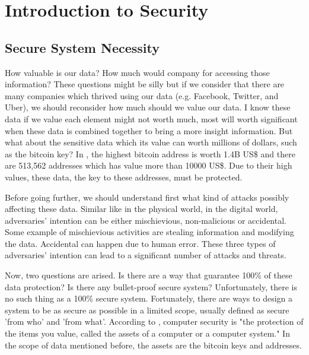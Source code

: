 \chapter{Introduction to Security}

\section{Secure System Necessity}
How valuable is our data? How much would company for accessing those information? These questions might be silly but if we consider that there are many companies which thrived using our data (e.g. Facebook, Twitter, and Uber), we should reconsider how much should we value our data. I know these data if we value each element might not worth much, most will worth significant when these data is combined together to bring a more insight information. But what about the sensitive data which its value can worth millions of dollars, such as the bitcoin key? In \cite{bitcoin}, the highest bitcoin address is worth 1.4B US\$ and there are 513,562 addresses which has value more than 10000 US\$. Due to their high values, these data, the key to these addresses, must be protected.

Before going further, we should understand first what kind of attacks possibly affecting these data. Similar like in the physical world, in the digital world, adversaries' intention can be either mischievious, non-malicious or accidental. Some example of mischievious activities are stealing information and modifying the data. Accidental can happen due to human error. These three types of adversaries' intention can lead to a significant number of attacks and threats.

Now, two questions are arised. Is there are a way that guarantee 100\% of these data protection? Is there any bullet-proof secure system? Unfortunately, there is no such thing as a 100\% secure system. Fortunately, there are ways to design a system to be as secure as possible in a limited scope, usually defined as secure 'from who' and 'from what'. According to \cite{Pfleeger}, computer security is "the protection of the items you value, called the assets of a computer or a computer system." In the scope of data mentioned before, the assets are the bitcoin keys and addresses.

